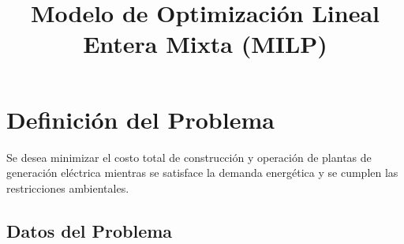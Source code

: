 \documentclass{article}
\begin{document}
\title{Modelo de Optimización Lineal Entera Mixta (MILP)}
\author{}
\date{}
\maketitle

\section{Definición del Problema}

Se desea minimizar el costo total de construcción y operación de plantas de generación eléctrica mientras se satisface la demanda energética y se cumplen las restricciones ambientales.

\subsection{Datos del Problema}
\end{document}
